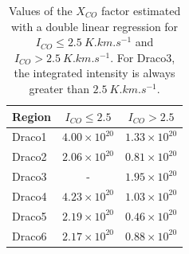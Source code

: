 \documentclass[traditabstract]{aa}
\begin{document}
\begin{table}[h]
  \centering
  \begin{tabular}{lcc}
    \hline \hline
    Region &   $I_{CO}\leq 2.5$   &     $I_{CO}>2.5$     \\ \hline 
    Draco1 & $4.00\times 10^{20}$ & $1.33\times 10^{20}$ \\
    Draco2 & $2.06\times 10^{20}$ & $0.81\times 10^{20}$ \\
    Draco3 &          -           & $1.95\times 10^{20}$ \\
    Draco4 & $4.23\times 10^{20}$ & $1.03\times 10^{20}$ \\
    Draco5 & $2.19\times 10^{20}$ & $0.46\times 10^{20}$ \\
    Draco6 & $2.17\times 10^{20}$ & $0.88\times 10^{20}$ \\ \hline
  \end{tabular}
  \caption{\label{table:Xco} Values of the $X_{CO}$ factor estimated with a double linear regression for $I_{CO}\leq 2.5\: K.km.s^{-1}$ and $I_{CO}>2.5\: K.km.s^{-1}$. For Draco3, the integrated intensity is always greater than $2.5\: K.km.s^{-1}$.}
\end{table}

\end{document}
